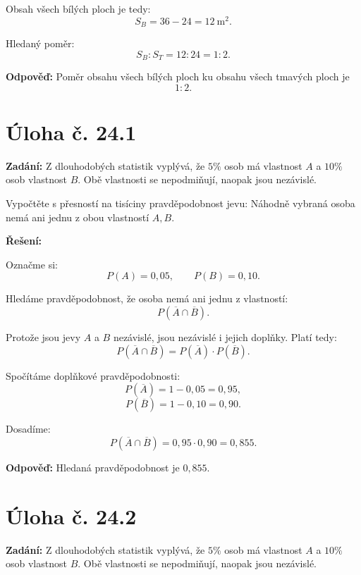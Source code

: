 \documentclass[12pt,a4paper]{article}
\begin{document}
\medskip

Obsah všech bílých ploch je tedy:
\[
S_B=36-24=12\ \mathrm{m}^2.
\]

Hledaný poměr:
\[
S_B:S_T=12:24=1:2.
\]

\bigskip

\textbf{Odpověď:}  
Poměr obsahu všech bílých ploch ku obsahu všech tmavých ploch je
\[
1:2.
\]



\newpage
\section*{Úloha č. 24.1}

\textbf{Zadání:}  
Z dlouhodobých statistik vyplývá, že \(5\%\) osob má vlastnost \(A\) a \(10\%\) osob vlastnost \(B\). Obě vlastnosti se nepodmiňují, naopak jsou nezávislé.

Vypočtěte s přesností na tisíciny pravděpodobnost jevu:  
Náhodně vybraná osoba nemá ani jednu z obou vlastností \(A, B\).

\bigskip

\textbf{Řešení:}

Označme si:
\[
P(A)=0{,}05,\qquad P(B)=0{,}10.
\]

Hledáme pravděpodobnost, že osoba nemá ani jednu z vlastností:
\[
P(\overline{A}\cap \overline{B}).
\]

Protože jsou jevy \(A\) a \(B\) nezávislé, jsou nezávislé i jejich doplňky. Platí tedy:
\[
P(\overline{A}\cap \overline{B})=P(\overline{A})\cdot P(\overline{B}).
\]

Spočítáme doplňkové pravděpodobnosti:
\[
P(\overline{A})=1-0{,}05=0{,}95,
\]
\[
P(\overline{B})=1-0{,}10=0{,}90.
\]

Dosadíme:
\[
P(\overline{A}\cap \overline{B})=0{,}95\cdot 0{,}90=0{,}855.
\]

\bigskip

\textbf{Odpověď:}  
Hledaná pravděpodobnost je \(0{,}855\).


\section*{Úloha č. 24.2}

\textbf{Zadání:}  
Z dlouhodobých statistik vyplývá, že \(5\%\) osob má vlastnost \(A\) a \(10\%\) osob vlastnost \(B\). Obě vlastnosti se nepodmiňují, naopak jsou nezávislé.
\end{document}
